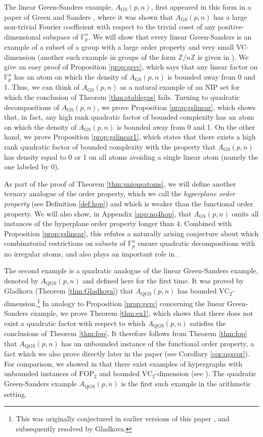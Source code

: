 \documentclass[12pt,oneside,british,a4wide]{amsart}
\numberwithin{equation}{section}
\theoremstyle{definition}
\def\Z{\mathbb{Z}}
\def\F{\mathbb{F}}
\def\FOP{\mathrm{FOP}}
\def\VC{\mathrm{VC}}
\def\GS{\mathrm{GS}}
\def\QGS{\mathrm{QGS}}
\begin{document}
The linear Green-Sanders example, $A_\GS(p,n)$, first appeared in this form in a paper of Green and Sanders  \cite{Green.2015qy4}, where it was shown that $A_\GS(p,n)$ has a large non-trivial Fourier coefficient with respect to the trivial coset of any positive-dimensional subspace of $\F_p^n$.  We will  show that every linear Green-Sanders is an example of a subset of a group with a large order property and very small VC-dimension (another such example in groups of the form $\Z/n\Z$ is given in \cite{Alon.2018is}).  We give an easy proof of Proposition \ref{prop:gsvc}, which says that any linear factor on $\F_p^n$ has an atom on which the density of $A_\GS(p,n)$ is bounded away from 0 and 1. Thus, we can think of $A_\GS(p,n)$ as a natural example of an NIP set for which the conclusion of Theorem  \ref{thm:stablegps} fails.  Turning to quadratic decompositions of $A_{\GS}(p,n)$, we prove Proposition \ref{prop:gslinear}, which shows that, in fact, any high rank quadratic factor of bounded complexity has an atom on which the density of $A_\GS(p,n)$ is bounded away from 0 and 1. On the other hand, we prove Proposition \ref{prop:gslinear1}, which states that  there exists a high rank quadratic factor of bounded complexity with the property that $A_{\GS}(p,n)$ has density equal to 0 or 1 on all atoms avoiding a single linear atom (namely the one labeled by 0).

As part of the proof of Theorem \ref{thm:unionsatoms}, we will define another ternary analogue of the order property, which we call the \emph{hyperplane order property} (see Definition \ref{def:hop}) and which is weaker than the functional order property. We will also show, in Appendix \ref{app:no4hop}, that $A_\GS(p,n)$ omits all instances of the hyperplane order property longer than $4$. Combined with Proposition \ref{prop:gslinear}, this refutes a naturally arising conjecture about which combinatorial restrictions on subsets of $\F_p^n$ ensure quadratic decompositions with no irregular atoms, and also plays an important role in \cite[Section 7]{Terry.2021b}.

The second example is a quadratic analogue of the linear Green-Sanders example, denoted by $A_\QGS(p, n)$ and defined here for the first time. It was proved by Gladkova (Theorem \ref{thm:Gladkova}) that $A_\QGS(p, n)$ has bounded $\VC_2$-dimension.\footnote{This was originally conjectured in earlier versions of this paper \cite{Terry.2021av2}, and subsequently resolved by Gladkova.} In analogy to Proposition \ref{prop:gsvc} concerning the linear Green-Sanders example, we prove Theorem \ref{thm:ex1}, which shows that there does not exist a quadratic factor with respect to which $A_\QGS(p, n)$ satisfies the conclusions of Theorem \ref{thm:fop}. It therefore follows from Theorem  \ref{thm:fop} that $A_\QGS(p, n)$ has an unbounded instance of the functional order property, a fact which we also prove directly later in the paper (see Corollary \ref{cor:qgscor}). For comparison, we showed in \cite{Terry.2021b} that there exist examples of hypergraphs with unbounded instances of $\FOP_2$ and bounded $\VC_2$-dimension (see \cite[Example D.5]{Terry.2021b}). The quadratic Green-Sanders example $A_\QGS(p, n)$ is the first such example in the arithmetic setting.
\end{document}
